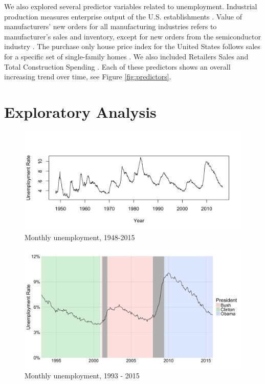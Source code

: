 \documentclass[twoside,twocolumn]{article}
\begin{document}
We also explored several predictor variables related to unemployment.  Industrial production measures enterprise output of the U.S. establishments \citep{BGFS2016}. Value of manufacturers' new orders for all manufacturing industries refers to manufacturer's sales and inventory, except for new orders from the semiconductor industry \citep{vmno}. The purchase only house price index for the United States follows sales for a specific set of single-family homes \citep{fhfa2016}. We also included Retailers Sales \citep{retail2016} and Total Construction Spending \citep{construction2016}. Each of these predictors shows an overall increasing trend over time, see Figure \ref{fig:predictors}.

\section{Exploratory Analysis}
		\begin{figure}[htb]
		\centering
		\caption{Monthly unemployment, 1948-2015}
		\label{fig:unemployment}
		\includegraphics[width=\linewidth]{images/unemployment_total_sa}
	\end{figure}

				\begin{figure}[htb]
		\centering
		\caption{Monthly unemployment, 1993 - 2015}
		\label{fig:presunemp}
		\includegraphics[width=\linewidth]{images/presunemp}
		\end{figure}
\end{document}
